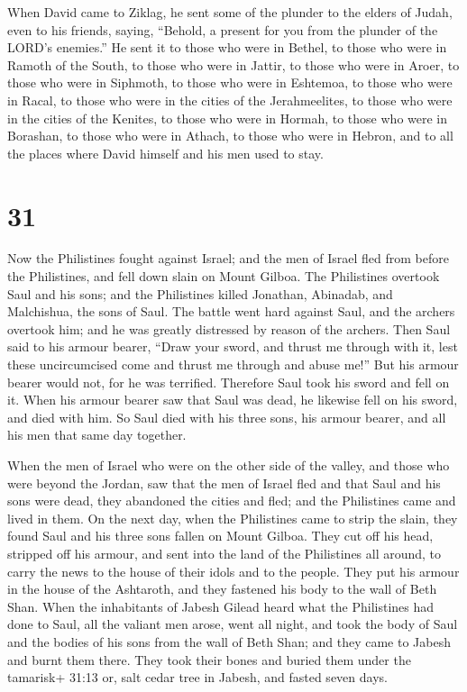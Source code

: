  When David came to Ziklag, he sent some of the plunder to
the elders of Judah, even to his friends, saying, ``Behold, a present
for you from the plunder of the LORD's enemies.''  He sent
it to those who were in Bethel, to those who were in Ramoth of the
South, to those who were in Jattir,  to those who were in
Aroer, to those who were in Siphmoth, to those who were in Eshtemoa,
 to those who were in Racal, to those who were in the
cities of the Jerahmeelites, to those who were in the cities of the
Kenites,  to those who were in Hormah, to those who were in
Borashan, to those who were in Athach,  to those who were
in Hebron, and to all the places where David himself and his men used to
stay.

\hypertarget{section-30}{%
\section{31}\label{section-30}}

 Now the Philistines fought against Israel; and the men of
Israel fled from before the Philistines, and fell down slain on Mount
Gilboa.  The Philistines overtook Saul and his sons; and the
Philistines killed Jonathan, Abinadab, and Malchishua, the sons of Saul.
 The battle went hard against Saul, and the archers overtook
him; and he was greatly distressed by reason of the archers.
 Then Saul said to his armour bearer, ``Draw your sword, and
thrust me through with it, lest these uncircumcised come and thrust me
through and abuse me!'' But his armour bearer would not, for he was
terrified. Therefore Saul took his sword and fell on it. 
When his armour bearer saw that Saul was dead, he likewise fell on his
sword, and died with him.  So Saul died with his three sons,
his armour bearer, and all his men that same day together.

 When the men of Israel who were on the other side of the
valley, and those who were beyond the Jordan, saw that the men of Israel
fled and that Saul and his sons were dead, they abandoned the cities and
fled; and the Philistines came and lived in them.  On the
next day, when the Philistines came to strip the slain, they found Saul
and his three sons fallen on Mount Gilboa.  They cut off his
head, stripped off his armour, and sent into the land of the Philistines
all around, to carry the news to the house of their idols and to the
people.  They put his armour in the house of the Ashtaroth,
and they fastened his body to the wall of Beth Shan.  When
the inhabitants of Jabesh Gilead heard what the Philistines had done to
Saul,  all the valiant men arose, went all night, and took
the body of Saul and the bodies of his sons from the wall of Beth Shan;
and they came to Jabesh and burnt them there.  They took
their bones and buried them under the tamarisk+ 31:13 or, salt cedar
tree in Jabesh, and fasted seven days.
